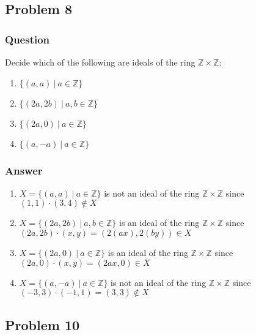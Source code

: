 \documentclass[12pt]{article}
\begin{document}
\subsection{Problem 8}

\subsubsection{Question}
Decide which of the following are ideals of the ring $\mathbb{Z} \times \mathbb{Z}$:
\begin{enumerate}
\item $\{ (a,a)\ |\ a \in \mathbb{Z} \}$
\item $\{ (2a,2b)\ |\ a,b \in \mathbb{Z} \}$
\item $\{ (2a,0)\ |\ a \in \mathbb{Z} \}$
\item $\{ (a,-a)\ |\ a \in \mathbb{Z} \}$
\end{enumerate}
\subsubsection{Answer}
\begin{enumerate}
\item $X=\{ (a,a)\ |\ a \in \mathbb{Z} \}$ is not an ideal of the ring $\mathbb{Z} \times \mathbb{Z}$ since $(1,1)\cdot(3,4)\notin X $
\item $X=\{ (2a,2b)\ |\ a,b \in \mathbb{Z} \}$  is an ideal of the ring $\mathbb{Z} \times \mathbb{Z}$ since $(2a,2b)\cdot(x,y)=(2 (a x),2 (b y))\in X$
\item $X=\{ (2a,0)\ |\ a \in \mathbb{Z} \}$ is an ideal of the ring $\mathbb{Z} \times \mathbb{Z}$ since $(2a,0)\cdot(x,y)=(2 a x,0)\in X$
\item $X=\{ (a,-a)\ |\ a \in \mathbb{Z} \}$ is not an ideal of the ring $\mathbb{Z} \times \mathbb{Z}$ since $(-3,3)\cdot (-1,1) = (3,3)\notin X$
\end{enumerate}

\subsection{Problem 10}
\end{document}
